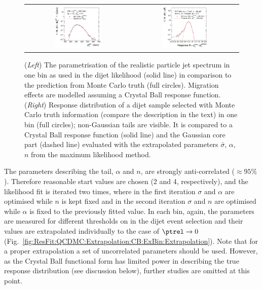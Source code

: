 \begin{figure}[ht]
  \centering
  \begin{tabular}{cc}
    \includegraphics[width=0.45\textwidth]{figures/ResFit_Spring10QCDFlat_CB_Eta0_Spectrum_PtBin4} &
    \includegraphics[width=0.45\textwidth]{figures/ResFit_Spring10QCDFlat_CB_Eta0_MCClosure_PtBin4}
  \end{tabular}
\caption{(\textit{Left}) The parametrisation of the realistic particle jet \pt spectrum in one \pt bin as used in the dijet likelihood (solid line) in comparison to the prediction from Monte Carlo truth (full circles).
  Migration effects are modelled assuming a Crystal Ball response function. 
  (\textit{Right}) Response distribution of a dijet sample selected with Monte Carlo truth information (compare the description in the text) in one \pt bin (full circles); non-Gaussian tails are visible.
  It is compared to a Crystal Ball response function (solid line) and the Gaussian core part (dashed line) evaluated with the extrapolated parameters $\bar{\sigma}$, $\alpha$, $n$ from the maximum likelihood method.}
\label{fig:ResFit:QCDMC:Extrapolation:CB:ExBin:SpectrumAndMCClosure}
\end{figure}

The parameters describing the tail, $\alpha$ and $n$, are strongly anti-correlated ($\approx95\%$).
Therefore reasonable start values are chosen (2 and 4, respectively), and the likelihood fit is iterated two times, where in the first iteration $\sigma$ and $\alpha$ are optimised while $n$ is kept fixed and in the second iteration $\sigma$ and $n$ are optimised while $\alpha$ is fixed to the previously fitted value.
In each \pt bin, again, the parameters are measured for different thresholds on \ptrel in the dijet event selection and their values are extrapolated individually to the case of $\ptrel\rightarrow0$ (Fig.~\ref{fig:ResFit:QCDMC:Extrapolation:CB:ExBin:Extrapolation}).
Note that for a proper extrapolation a set of uncorrelated parameters should be used.
However, as the Crystal Ball functional form has limited power in describing the true response distribution (see discussion below), further studies are omitted at this point.

